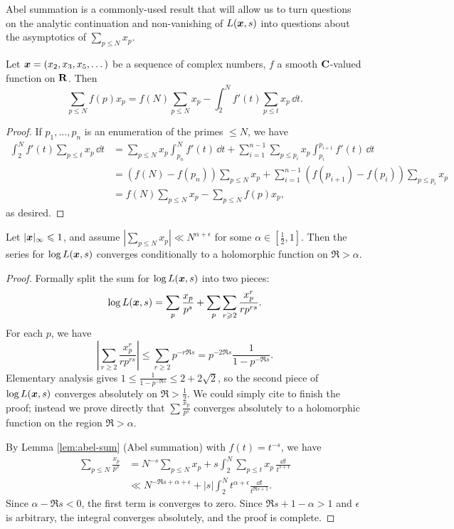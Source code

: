 Abel summation is a commonly-used result that will allow us to turn questions 
on the analytic continuation and non-vanishing of $L({\boldsymbol x},s)$ into questions 
about the asymptotics of $\sum_{p\leqslant N} x_p$. 

\begin{lemma}\label{lem:abel-sum}
Let ${\boldsymbol x}=(x_2,x_3,x_5,\dots)$ be a sequence of complex numbers, $f$ a smooth 
$\mathbf{C}$-valued function on $\mathbf{R}$. Then 
\[
	\sum_{p\leqslant N} f(p) x_p = f(N) \sum_{p\leqslant N} x_p - \int_2^N f'(t) \sum_{p\leqslant t} x_p\, \dd t .
\]
\end{lemma}
\begin{proof}
If $p_1,\dots,p_n$ is an enumeration of the primes $\leqslant N$, we have 
\begin{align*}
	\int_2^N f'(t) \sum_{p\leqslant t} x_p\, \dd t 
		&= \sum_{p\leqslant N} x_p \int_{p_n}^N f'(t)\, \dd t + \sum_{i=1}^{n-1} \sum_{p\leqslant p_i} x_p \int_{p_i}^{p_{i+1}} f'(t)\, \dd t \\
		&= \left(f(N) - f(p_n)\right) \sum_{p\leqslant N} x_p + \sum_{i=1}^{n-1} \left(f(p_{i+1}) - f(p_i)\right) \sum_{p\leqslant p_i} x_p \\
		&= f(N) \sum_{p\leqslant N} x_p - \sum_{p\leqslant N} f(p) x_p ,
\end{align*}
as desired. 
\end{proof}

\begin{theorem}\label{thm:AT->RH}
Let $|{\boldsymbol x}|_\infty \leqslant 1$, and assume 
$|\sum_{p\leqslant N} x_p| \ll N^{\alpha+\epsilon}$ for some 
$\alpha\in [\frac 1 2,1]$. Then the series for $\log L({\boldsymbol x},s)$ converges 
conditionally to a holomorphic function on $\Re > \alpha$. 
\end{theorem}
\begin{proof}
Formally split the sum for $\log L({\boldsymbol x},s)$ into two pieces: 
\[
	\log L({\boldsymbol x},s) = \sum_p \frac{x_p}{p^s} + \sum_p \sum_{r\geqslant 2} \frac{x_p^r}{r p^{r s}} .
\]
For each $p$, we have 
\[
	\left| \sum_{r\geqslant 2} \frac{x_p^r}{r p^{r s}}\right| \leqslant \sum_{r\geqslant 2} p^{- r \Re s} = p^{-2 \Re s} \frac{1}{1-p^{-\Re s}} .
\]
Elementary analysis gives 
$1 \leqslant \frac{1}{1-p^{-\Re s}} \leqslant 2 + 2\sqrt 2$, so the second 
piece of $\log L({\boldsymbol x},s)$ converges absolutely on $\Re >\frac 1 2$. We could 
simply cite \cite[II.1 Th.~10]{tenenbaum-1995} to finish the proof; instead we 
prove directly that $\sum \frac{x_p}{p^s}$ converges absolutely to a 
holomorphic function on the region $\Re > \alpha$. 

By Lemma \ref{lem:abel-sum} (Abel summation) with $f(t) = t^{-s}$, we have 
\begin{align}
	\sum_{p\leqslant N} \frac{x_p}{p^s}
		&= N^{-s} \sum_{p\leqslant N} x_p + s \int_2^N \sum_{p\leqslant t} x_p\, \frac{\dd t}{t^{s+1}} \label{eq:log-L-sum} \\ 
		&\ll N^{-\Re s + \alpha + \epsilon} + |s| \int_2^N t^{\alpha+\epsilon} \frac{\dd t}{t^{\Re s+1}} . \nonumber
\end{align}
Since $\alpha-\Re s < 0$, the first term is converges to zero. Since 
$\Re s+1-\alpha > 1$ and 
$\epsilon$ is arbitrary, the integral converges absolutely, and the proof is 
complete. 
\end{proof}

